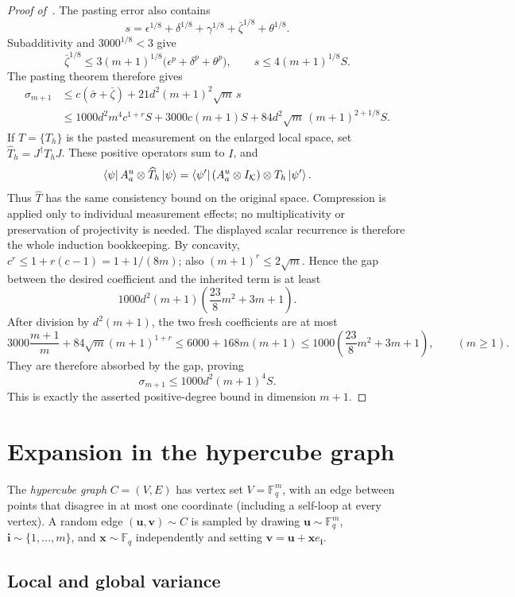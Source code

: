 \documentclass[11pt]{article}
\theoremstyle{definition}
\newcommand{\F}{\mathbb F}
\newcommand{\eps}{\epsilon}
\newcommand{\bi}{\boldsymbol{i}}
\newcommand{\bu}{\boldsymbol{u}}
\newcommand{\bv}{\boldsymbol{v}}
\newcommand{\bx}{{\boldsymbol{x}}}
\begin{document}
\begin{proof}[Proof of~]
The pasting error also contains
\[
 s=\eps^{1/8}+\delta^{1/8}+\gamma^{1/8}
   +\bar\zeta^{1/8}+\theta^{1/8}.
\]
Subadditivity and $3000^{1/8}<3$ give
\[
 \bar\zeta^{1/8}
 \leq3(m+1)^{1/8}
 \bigl(\eps^p+\delta^p+\theta^p\bigr),
 \qquad
 s\leq4(m+1)^{1/8}S.
\]
The pasting theorem therefore gives
\begin{align*}
 \sigma_{m+1}
 &\leq c(\bar\sigma+\bar\zeta)
       +21d^2(m+1)^2\sqrt{m}\,s\\
 &\leq1000d^2m^4c^{1+r}S
       +3000c(m+1)S
       +84d^2\sqrt{m}\,(m+1)^{2+1/8}S.
\end{align*}
If $T=\{T_h\}$ is the pasted measurement on the enlarged local space,
set $\widehat T_h=J^\dagger T_hJ$.  These positive operators sum to
$I$, and
\[
 \bra\psi A^u_a\otimes\widehat T_h\ket\psi
 =\bra{\psi'}(A^u_a\otimes I_{\mathcal K})\otimes T_h\ket{\psi'}.
\]
Thus $\widehat T$ has the same consistency bound on the original
space.  Compression is applied only to individual measurement
effects; no multiplicativity or preservation of projectivity is
needed.  The displayed scalar recurrence is therefore the whole
induction bookkeeping.
By concavity, $c^r\leq1+r(c-1)=1+1/(8m)$; also
$(m+1)^r\leq2\sqrt{m}$.  Hence the gap between the desired
coefficient and the inherited term is at least
\[
 1000d^2(m+1)\left(\frac{23}{8}m^2+3m+1\right).
\]
After division by $d^2(m+1)$, the two fresh coefficients are at most
\[
  3000\frac{m+1}{m}+84\sqrt{m}(m+1)^{1+r}
  \leq6000+168m(m+1)
  \leq1000\left(\frac{23}{8}m^2+3m+1\right),\qquad(m\geq1).
\]
They are therefore absorbed by the gap, proving
\[
 \sigma_{m+1}\leq1000d^2(m+1)^4S.
\]
This is exactly the asserted positive-degree bound in dimension $m+1$.
\end{proof}

\section{Expansion in the hypercube graph}
\label{sec:expansion}

\begin{definition}
The \emph{hypercube graph} $C=(V,E)$ has vertex set $V=\F_q^m$,
with an edge between points that disagree in at most one coordinate
(including a self-loop at every vertex).
A random edge $(\bu,\bv)\sim C$ is sampled by drawing
$\bu\sim\F_q^m$, $\bi\sim\{1,\ldots,m\}$, and $\bx\sim\F_q$
independently and setting $\bv=\bu+\bx e_{\bi}$.
\end{definition}

\subsection{Local and global variance}
\end{document}
